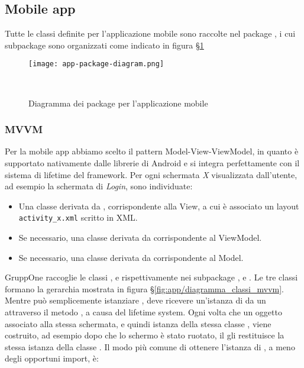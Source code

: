 \documentclass[../../manuale-manutentore.tex]{subfiles}
\begin{document}
\subsection{Mobile app}%
\label{sub:mobile_app}

Tutte le classi definite per l'applicazione mobile sono raccolte nel package , i cui subpackage sono organizzati come indicato in figura §\ref{fig:app/diagramma_package}
\begin{figure}[h]
  \centering
  \texttt{[image: app-package-diagram.png]}
  \caption{Diagramma dei package per l'applicazione mobile}
~~\label{fig:app/diagramma_package}
\end{figure}

\subsubsection{MVVM}%
\label{subs:mvvm}

Per la mobile app abbiamo scelto il pattern Model-View-ViewModel, in quanto è supportato nativamente dalle librerie di Android e si integra perfettamente con il sistema di lifetime del framework. Per ogni schermata \textit{X} visualizzata dall'utente, ad esempio la schermata di \textit{Login}, sono individuate:
\begin{itemize}
  \item Una classe  derivata da , corrispondente alla View, a cui è associato un layout \linebreak[1]\texttt{activity\_x.xml} scritto in XML\@.
  \item Se necessario, una classe  derivata da  corrispondente al ViewModel.
  \item Se necessario, una classe  derivata da  corrispondente al Model.
\end{itemize}

GruppOne raccoglie le classi ,  e  rispettivamente nei subpackage ,  e .
Le tre classi formano la gerarchia mostrata in figura §\ref{fig:app/diagramma_classi_mvvm}.
Mentre  può semplicemente istanziare ,  deve ricevere un'istanza di  da un  attraverso il metodo , a causa del lifetime system.
Ogni volta che un oggetto associato alla stessa schermata, e quindi istanza della stessa classe , viene costruito, ad esempio dopo che lo schermo è stato ruotato, il  gli restituisce la stessa istanza della classe .
Il modo più comune di ottenere l'istanza di , a meno degli opportuni import, è:
\end{document}
